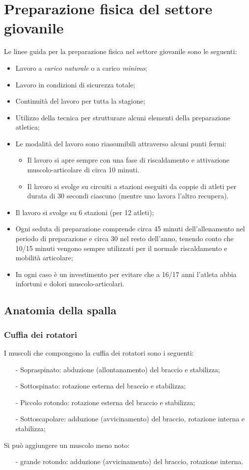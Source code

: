 \chapter{Preparazione fisica del settore giovanile}

Le linee guida per la preparazione fisica nel settore giovanile sono le seguenti:
\begin{itemize}
\item Lavoro a \emph{carico naturale} o a carico \emph{minimo};
\item Lavoro in condizioni di sicurezza totale;
\item Continuità del lavoro per tutta la stagione;
\item Utilizzo della tecnica per strutturare alcuni elementi della preparazione atletica;
\item Le modalità del lavoro sono riassumibili attraverso alcuni punti fermi:
\begin{itemize}
\item Il lavoro si apre sempre con una fase di riscaldamento e attivazione muscolo-articolare di circa 10 minuti.
\item Il lavoro si svolge su circuiti a stazioni eseguiti da coppie di atleti per durata di 30 secondi ciascuno (mentre uno lavora l'altro recupera).
\end{itemize}
\item Il lavoro si svolge su 6 stazioni (per 12 atleti);
\item Ogni seduta di preparazione comprende circa 45 minuti dell'allenamento nel periodo di preparazione e circa 30 nel resto dell'anno, tenendo conto che 10/15 minuti vengono sempre utilizzati per il normale riscaldamento e mobilità articolare;
\item In ogni caso è un investimento per evitare che a 16/17 anni l'atleta abbia infortuni e dolori muscolo-articolari.
\end{itemize}

\section{Anatomia della spalla}

\subsection{Cuffia dei rotatori}
I muscoli che compongono la cuffia dei rotatori sono i seguenti:
\begin{itemize}
\item[-]Sopraspinato: abduzione (allontanamento) del braccio e stabilizza;
\item[-]Sottospinato: rotazione esterna del braccio e stabilizza;
\item[-]Piccolo rotondo: rotazione esterna del braccio e stabilizza;
\item[-]Sottoscapolare: adduzione (avvicinamento) del braccio, rotazione interna e stabilizza;
\end{itemize}
Si può aggiungere un muscolo meno noto:
\begin{itemize}
\item[-]grande rotondo: adduzione (avvicinamento) del braccio, rotazione interna.
\end{itemize}

\section{}
